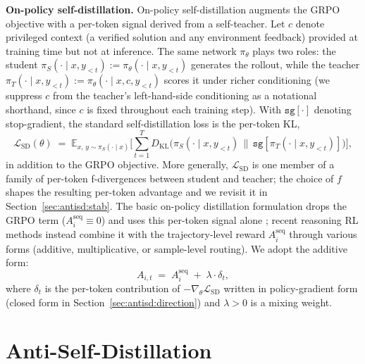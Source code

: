 \documentclass{llmxive}
\begin{document}
\textbf{On-policy self-distillation.} On-policy self-distillation augments the GRPO objective with a per-token signal derived from a self-teacher. Let $c$ denote privileged context (a verified solution and any environment feedback) provided at training time but not at inference. The same network $\pi_\theta$ plays two roles: the student $\pi_S(\cdot \mid x, y_{<t}) := \pi_\theta(\cdot \mid x, y_{<t})$ generates the rollout, while the teacher $\pi_T(\cdot \mid x, y_{<t}) := \pi_\theta(\cdot \mid x, c, y_{<t})$ scores it under richer conditioning (we suppress $c$ from the teacher's left-hand-side conditioning as a notational shorthand, since $c$ is fixed throughout each training step). With $\texttt{sg}[\cdot]$ denoting stop-gradient, the standard self-distillation loss is the per-token KL,
\begin{equation}
  \label{eq:sd}
  \mathcal{L}_{\mathrm{SD}}(\theta)
  \;=\;
  \mathbb{E}_{x,\, y \sim \pi_S(\cdot \mid x)}
  \Big[ \sum_{t=1}^{T} D_{\mathrm{KL}}\!\big( \pi_S(\cdot \mid x, y_{<t}) \,\big\|\, \texttt{sg}[\pi_T(\cdot \mid x, y_{<t})] \big) \Big],
\end{equation}
in addition to the GRPO objective. More generally, $\mathcal{L}_{\mathrm{SD}}$ is one member of a family of per-token f-divergences between student and teacher; the choice of $f$ shapes the resulting per-token advantage and we revisit it in Section~\ref{sec:antisd:stab}. The basic on-policy distillation formulation drops the GRPO term ($A_i^{\mathrm{seq}} \equiv 0$) and uses this per-token signal alone \citep{gkd,fu2026revisitingonpolicydistillationempirical,opsd}; recent reasoning RL methods \citep{sdpo,li2026unifying,xiao2026mimo} instead combine it with the trajectory-level reward $A_i^{\mathrm{seq}}$ through various forms (additive, multiplicative, or sample-level routing). We adopt the additive form:
\begin{equation}
  \label{eq:adv-combined}
  A_{i,t} \;=\; A_i^{\mathrm{seq}} \;+\; \lambda \cdot \delta_t,
\end{equation}
where $\delta_t$ is the per-token contribution of $-\nabla_\theta \mathcal{L}_{\mathrm{SD}}$ written in policy-gradient form (closed form in Section~\ref{sec:antisd:direction}) and $\lambda > 0$ is a mixing weight.

\section{Anti-Self-Distillation}
\label{sec:antisd}
\vspace{-.5em}
\end{document}
